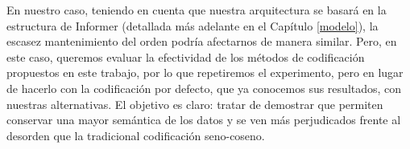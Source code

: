 En nuestro caso, teniendo en cuenta que nuestra arquitectura se basará en la estructura de Informer (detallada más adelante en el Capítulo \ref{modelo}), la escasez mantenimiento del orden podría afectarnos de manera similar. Pero, en este caso, queremos evaluar la efectividad de los métodos de codificación propuestos en este trabajo, por lo que repetiremos el experimento, pero en lugar de hacerlo con la codificación por defecto, que ya conocemos sus resultados, con nuestras alternativas. El objetivo es claro: tratar de demostrar que permiten conservar una mayor semántica de los datos y se ven más perjudicados frente al desorden que la tradicional codificación seno-coseno.

